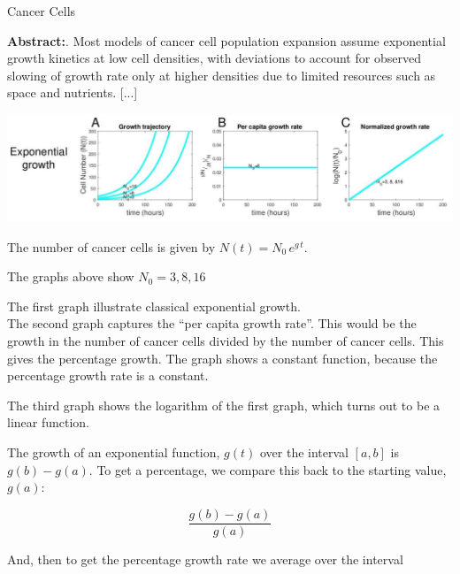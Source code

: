 \documentclass{ximera}
\begin{document}
\begin{example} Cancer Cells 


\textbf{Abstract:}. Most models of cancer cell population expansion assume exponential growth kinetics at low cell densities, with deviations to account for observed slowing of growth rate only at higher densities due to limited resources such as space and nutrients. [...] \\


\begin{image}
\includegraphics{pics/cancer_growth.png}
\end{image}


The number of cancer cells is given by $N(t) = N_0 \, e^{g \, t}$.

The graphs above show $N_0 = 3, 8, 16$

The first graph illustrate classical exponential growth.  \\

The second graph captures the ``per capita growth rate''.  This would be the growth in the number of cancer cells divided by the number of cancer cells. This gives the percentage growth.  The graph shows a constant function, because the percentage growth rate is a constant.

The third graph shows the logarithm of the first graph, which turns out to be a linear function.



\end{example}







The growth of an exponential function, $g(t)$ over the interval $[a, b]$ is $g(b)-g(a)$. To get a percentage, we compare this back to the starting value, $g(a)$: 

\[      \frac{g(b)-g(a)}{g(a)}    \]

And, then to get the percentage growth rate we average over the interval
\end{document}
